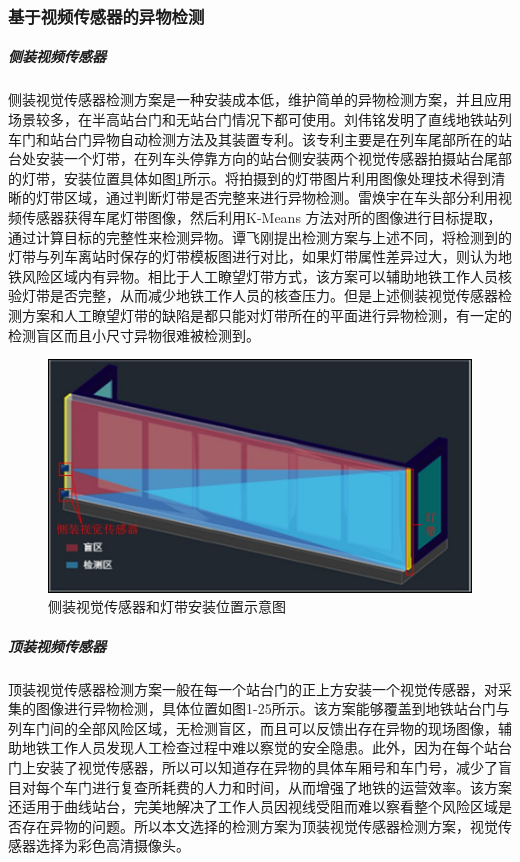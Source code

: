 \subsubsection*{基于视频传感器的异物检测}
\subparagraph*{\textbf{侧装视频传感器}}
侧装视觉传感器检测方案是一种安装成本低，维护简单的异物检测方案，并且应用场景较多，在半高站台门和无站台门情况下都可使用。刘伟铭\cite{刘伟铭2013直线地铁站台屏蔽门与列车间异物自动检测方法及其装置}发明了直线地铁站列车门和站台门异物自动检测方法及其装置专利。该专利主要是在列车尾部所在的站台处安装一个灯带，在列车头停靠方向的站台侧安装两个视觉传感器拍摄站台尾部的灯带，安装位置具体如图\ref{侧装视觉传感器}所示。将拍摄到的灯带图片利用图像处理技术得到清晰的灯带区域，通过判断灯带是否完整来进行异物检测。雷焕宇\cite{雷焕宇0基于机器视觉的户外站台列车和屏蔽门之间异物检测系统研究,雷焕宇2018基于}在车头部分利用视频传感器获得车尾灯带图像，然后利用K-Means 方法对所的图像进行目标提取，通过计算目标的完整性来检测异物。谭飞刚\cite{谭飞刚2017一种基于计算机视觉的地铁站台异物检测算法}提出检测方案与上述不同，将检测到的灯带与列车离站时保存的灯带模板图进行对比，如果灯带属性差异过大，则认为地铁风险区域内有异物。相比于人工瞭望灯带方式，该方案可以辅助地铁工作人员核验灯带是否完整，从而减少地铁工作人员的核查压力。但是上述侧装视觉传感器检测方案和人工瞭望灯带的缺陷是都只能对灯带所在的平面进行异物检测，有一定的检测盲区而且小尺寸异物很难被检测到。
\begin{figure}[htbp]
	\centering
	\includegraphics[scale=1]{Fig/侧装视觉传感器.jpg}
	\caption{\label{侧装视觉传感器}侧装视觉传感器和灯带安装位置示意图}
\end{figure}
\subparagraph*{\textbf{顶装视频传感器}}
顶装视觉传感器检测方案一般在每一个站台门的正上方安装一个视觉传感器，对采集的图像进行异物检测，具体位置如图1-25所示。该方案能够覆盖到地铁站台门与列车门间的全部风险区域，无检测盲区，而且可以反馈出存在异物的现场图像，辅助地铁工作人员发现人工检查过程中难以察觉的安全隐患。此外，因为在每个站台门上安装了视觉传感器，所以可以知道存在异物的具体车厢号和车门号，减少了盲目对每个车门进行复查所耗费的人力和时间，从而增强了地铁的运营效率。该方案还适用于曲线站台，完美地解决了工作人员因视线受阻而难以察看整个风险区域是否存在异物的问题。所以本文选择的检测方案为顶装视觉传感器检测方案，视觉传感器选择为彩色高清摄像头。
